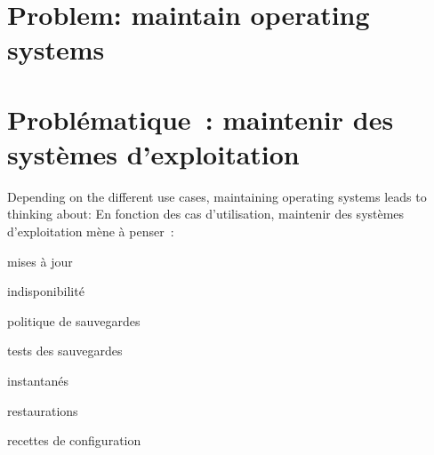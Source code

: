 \ml
{\chapter{Problem: maintain operating systems}}
{\chapter{Problématique : maintenir des systèmes d’exploitation}}

\ml
{Depending on the different use cases,
maintaining operating systems leads to thinking about:}
{En fonction des cas d’utilisation,
maintenir des systèmes d’exploitation mène à penser :}

\begin{itmz}
\item{
{mises à jour}}
\item{
{indisponibilité}}
\item{
{politique de sauvegardes}}
\item{
{tests des sauvegardes}}
\item{
{instantanés}}
\item{
{restaurations}}
\item{
{recettes de configuration}}
\end{itmz}




